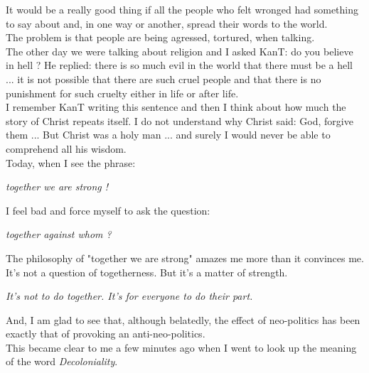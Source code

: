 \documentclass[11pt]{book}
\begin{document}
\noindent It would be a really good thing if all the people who felt wronged had something to say about and, in one way or another, spread their words to the world. \\

\noindent The problem is that people are being agressed, tortured, when talking. \\

\noindent The other day we were talking about religion and I asked KanT: do you believe in hell ? He replied: there is so much evil in the world that there must be a hell ... it is not possible that there are such cruel people and that there is no punishment for such cruelty either in life or after life. \\

\noindent I remember KanT writing this sentence and then I think about how much the story of Christ repeats itself. I do not understand why Christ said: God, forgive them ... But Christ was a holy man ... and surely I would never be able to comprehend all his wisdom. \\

\noindent Today, when I see the phrase:

\noindent \begin{center} \emph{together we are strong !} \end{center}

\noindent I feel bad and force myself to ask the question:

\noindent \begin{center} \emph{together against whom ?} \end{center}

\noindent The philosophy of "together we are strong" amazes me more than it convinces me. \\

\noindent It's not a question of togetherness. But it's a matter of strength.

\noindent \begin{center} \emph{It's not to do together. It's for everyone to do their part.} \end{center} 

\noindent And, I am glad to see that, although belatedly, the effect of neo-politics has been exactly that of provoking an anti-neo-politics. \\

\noindent This became clear to me a few minutes ago when I went to look up the meaning of the word \emph{Decoloniality}. \\
\end{document}
